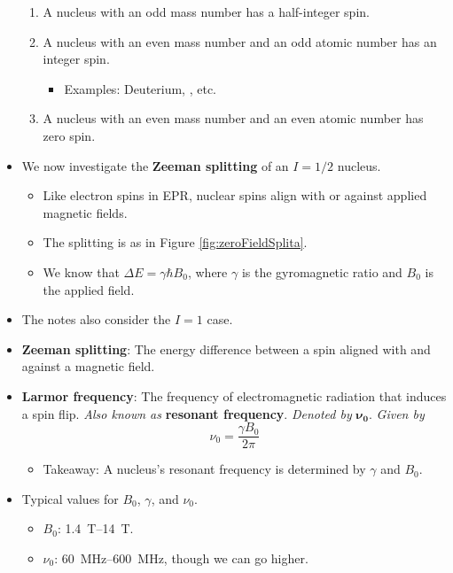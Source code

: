 \documentclass[../notes.tex]{subfiles}
\begin{document}
\begin{itemize}
    \begin{enumerate}
        \item A nucleus with an odd mass number has a half-integer spin.
        \item A nucleus with an even mass number and an odd atomic number has an integer spin.
        \begin{itemize}
            \item Examples: Deuterium, , etc.
        \end{itemize}
        \item A nucleus with an even mass number and an even atomic number has zero spin.
    \end{enumerate}
    \item We now investigate the \textbf{Zeeman splitting} of an $I=1/2$ nucleus.
    \begin{itemize}
        \item Like electron spins in EPR, nuclear spins align with or against applied magnetic fields.
        \item The splitting is as in Figure \ref{fig:zeroFieldSplita}.
        \item We know that $\Delta E=\gamma\hbar B_0$, where $\gamma$ is the gyromagnetic ratio and $B_0$ is the applied field.
    \end{itemize}
    \item The notes also consider the $I=1$ case.
    \item \textbf{Zeeman splitting}: The energy difference between a spin aligned with and against a magnetic field.
    \item \textbf{Larmor frequency}: The frequency of electromagnetic radiation that induces a spin flip. \emph{Also known as} \textbf{resonant frequency}. \emph{Denoted by} $\bm{\nu_0}$. \emph{Given by}
    \begin{equation*}
        \nu_0 = \frac{\gamma B_0}{2\pi}
    \end{equation*}
    \begin{itemize}
        \item Takeaway: A nucleus's resonant frequency is determined by $\gamma$ and $B_0$.
    \end{itemize}
    \item Typical values for $B_0$, $\gamma$, and $\nu_0$.
    \begin{itemize}
        \item $B_0$: \SIrange{1.4}{14}{\tesla}.
        \item $\nu_0$: \SIrange{60}{600}{\mega\hertz}, though we can go higher.

\end{itemize}
\end{itemize}
\end{document}
